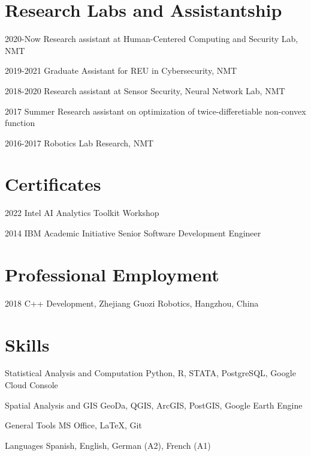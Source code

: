 \documentclass[12pt,letterpaper]{report}
\begin{document}
    \section*{Research Labs and Assistantship}
    \begin{tablist}
        \item[2020-Now] \tab{}Research assistant at Human-Centered Computing and Security Lab, NMT
        \item[2019-2021] \tab{}Graduate Assistant for REU in Cybersecurity, NMT
        \item[2018-2020] \tab{}Research assistant at Sensor Security, Neural Network Lab, NMT
        \item[2017 Summer] \tab{}Research assistant on optimization of twice-differetiable non-convex function
        \item[2016-2017] \tab{}Robotics Lab Research, NMT
    \end{tablist}

    \section*{Certificates}
    \begin{tablist}
        \item[2022] \tab{}Intel AI Analytics Toolkit Workshop
        \item[2014] \tab{}IBM Academic Initiative Senior Software Development Engineer
    \end{tablist}

    \section*{Professional Employment}
    \begin{tablist}
        \item[2018] \tab{}C++ Development, Zhejiang Guozi Robotics, Hangzhou, China
    \end{tablist}

    \section*{Skills}
    \begin{tablist}
        \item[Statistical Analysis and Computation] \tab{}Python, R, STATA, PostgreSQL, Google Cloud Console
        \item[Spatial Analysis and GIS] \tab{}GeoDa, QGIS, ArcGIS, PostGIS, Google Earth Engine
        \item[General Tools] \tab{}MS Office, LaTeX, Git
        \item[Languages] \tab{}Spanish, English, German (A2), French (A1)
    \end{tablist}
\end{document}
